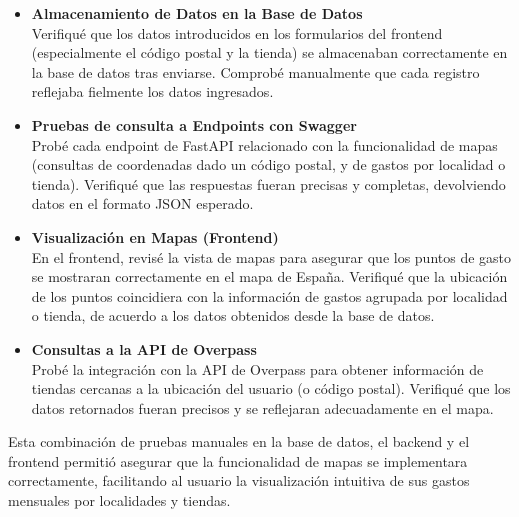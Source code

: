 \begin{itemize}
    \item \textbf{Almacenamiento de Datos en la Base de Datos}\\
     Verifiqué que los datos introducidos en los formularios del frontend (especialmente el código postal y la tienda) se almacenaban correctamente en la base de datos tras enviarse. Comprobé manualmente que cada registro reflejaba fielmente los datos ingresados.
    \item \textbf{Pruebas de consulta a Endpoints con Swagger}\\
     Probé cada endpoint de FastAPI relacionado con la funcionalidad de mapas (consultas de coordenadas dado un código postal, y de gastos por localidad o tienda). Verifiqué que las respuestas fueran precisas y completas, devolviendo datos en el formato JSON esperado.
    \item \textbf{Visualización en Mapas (Frontend)}\\
     En el frontend, revisé la vista de mapas para asegurar que los puntos de gasto se mostraran correctamente en el mapa de España. Verifiqué que la ubicación de los puntos coincidiera con la información de gastos agrupada por localidad o tienda, de acuerdo a los datos obtenidos desde la base de datos.
    \item \textbf{Consultas a la API de Overpass}\\
     Probé la integración con la API de Overpass para obtener información de tiendas cercanas a la ubicación del usuario (o código postal). Verifiqué que los datos retornados fueran precisos y se reflejaran adecuadamente en el mapa.
\end{itemize}

Esta combinación de pruebas manuales en la base de datos, el backend y el frontend permitió asegurar que la funcionalidad de mapas se implementara correctamente, facilitando al usuario la visualización intuitiva de sus gastos mensuales por localidades y tiendas.


